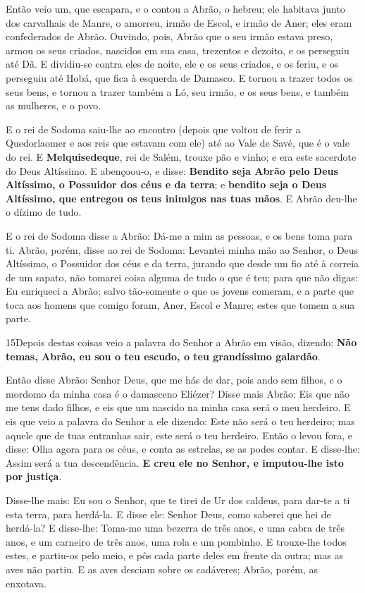 Então veio um, que escapara, e o contou a Abrão, o hebreu; ele
habitava junto dos carvalhais de Manre, o amorreu, irmão de Escol, e
irmão de Aner; eles eram confederados de Abrão. Ouvindo,
pois, Abrão que o seu irmão estava preso, armou os seus criados,
nascidos em sua casa, trezentos e dezoito, e os perseguiu até Dã.
E dividiu-se contra eles de noite, ele e os seus criados, e
os feriu, e os perseguiu até Hobá, que fica à esquerda de Damasco.
E tornou a trazer todos os seus bens, e tornou a trazer
também a Ló, seu irmão, e os seus bens, e também as mulheres, e o
povo.

E o rei de Sodoma saiu-lhe ao encontro (depois que voltou de
ferir a Quedorlaomer e aos reis que estavam com ele) até ao Vale de
Savé, que é o vale do rei. E \textbf{Melquisedeque}, rei de
Salém, trouxe pão e vinho; e era este sacerdote do Deus Altíssimo.
E abençoou-o, e disse: \textbf{Bendito seja Abrão pelo Deus
Altíssimo, o Possuidor dos céus e da terra}; e
\textbf{bendito seja o Deus Altíssimo, que entregou os teus inimigos
nas tuas mãos}. E Abrão deu-lhe o dízimo de tudo.

E o rei de Sodoma disse a Abrão: Dá-me a mim as pessoas, e os
bens toma para ti. Abrão, porém, disse ao rei de Sodoma:
Levantei minha mão ao Senhor, o Deus Altíssimo, o Possuidor dos céus
e da terra, jurando que desde um fio até à correia de um
sapato, não tomarei coisa alguma de tudo o que é teu; para que não
digas: Eu enriqueci a Abrão; salvo tão-somente o que os
jovens comeram, e a parte que toca aos homens que comigo foram,
Aner, Escol e Manre; estes que tomem a sua parte.

\smallskip

\lettrine{15} Depois destas coisas veio a palavra do Senhor a
Abrão em visão, dizendo: \textbf{Não temas, Abrão, eu sou o teu
escudo, o teu grandíssimo galardão}.

Então disse Abrão: Senhor Deus, que me hás de dar, pois ando sem
filhos, e o mordomo da minha casa é o damasceno Eliézer? Disse
mais Abrão: Eis que não me tens dado filhos, e eis que um nascido na
minha casa será o meu herdeiro. E eis que veio a palavra do
Senhor a ele dizendo: Este não será o teu herdeiro; mas aquele que
de tuas entranhas sair, este será o teu herdeiro. Então o levou
fora, e disse: Olha agora para os céus, e conta as estrelas, se as
podes contar. E disse-lhe: Assim será a tua descendência.
\textbf{E creu ele no Senhor, e imputou-lhe isto por justiça}.

Disse-lhe mais: Eu sou o Senhor, que te tirei de Ur dos caldeus,
para dar-te a ti esta terra, para herdá-la. E disse ele: Senhor
Deus, como saberei que hei de herdá-la? E disse-lhe: Toma-me uma
bezerra de três anos, e uma cabra de três anos, e um carneiro de
três anos, uma rola e um pombinho. E trouxe-lhe todos estes,
e partiu-os pelo meio, e pôs cada parte deles em frente da outra;
mas as aves não partiu. E as aves desciam sobre os cadáveres;
Abrão, porém, as enxotava.

